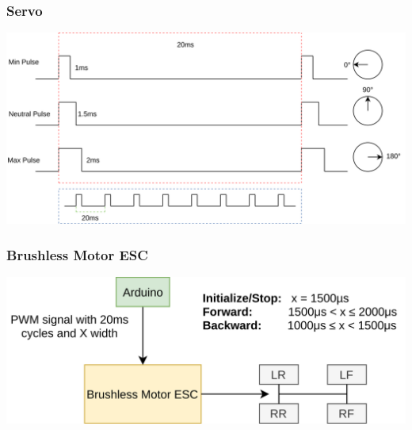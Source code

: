 \documentclass{beamer}
\begin{document}
\begin{frame}
    \frametitle{Servo}
    \includegraphics[width=\linewidth]{img/servo.png}
\end{frame}

\begin{frame}
    \frametitle{Brushless Motor ESC}
    \includegraphics[width=\linewidth]{img/brushless-motor-esc}
\end{frame}
\end{document}
